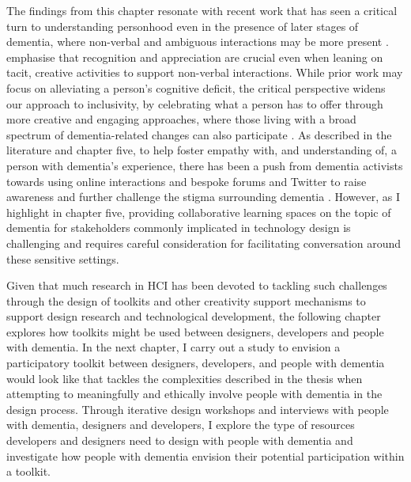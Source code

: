 The findings from this chapter resonate with recent work that has seen a critical turn to understanding personhood even in the presence of later stages of dementia, where non-verbal and ambiguous interactions may be more present \citep{majlesi2017video}. \cite{treadaway_sensor_2016} emphasise that recognition and appreciation are crucial even when leaning on tacit, creative activities to support non-verbal interactions. While prior work may focus on alleviating a person's cognitive deficit, the critical perspective widens our approach to inclusivity, by celebrating what a person has to offer through more creative and engaging approaches, where those living with a broad spectrum of dementia-related changes can also participate \citep{lazar_critical_2017}. As described in the literature and chapter five, to help foster empathy with, and understanding of, a person with dementia's experience, there has been a push from dementia activists towards using online interactions and bespoke forums and Twitter to raise awareness and further challenge the stigma surrounding dementia \citep{talbot_how_2020}. However, as I highlight in chapter five, providing collaborative learning spaces on the topic of dementia for stakeholders commonly implicated in technology design is challenging and requires careful consideration for facilitating conversation around these sensitive settings.

Given that much research in HCI has been devoted to tackling such challenges through the design of toolkits and other creativity support mechanisms to support design research and technological development, the following chapter explores how toolkits might be used between designers, developers and people with dementia. In the next chapter, I carry out a study to envision a participatory toolkit between designers, developers, and people with dementia would look like that tackles the complexities described in the thesis when attempting to meaningfully and ethically involve people with dementia in the design process. Through iterative design workshops and interviews with people with dementia, designers and developers, I explore the type of resources developers and designers need to design with people with dementia and investigate how people with dementia envision their potential participation within a toolkit.


